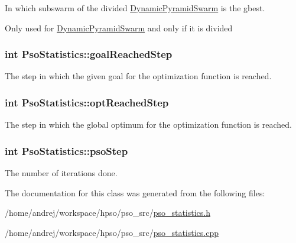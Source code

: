 In which subswarm of the divided \hyperlink{classDynamicPyramidSwarm}{DynamicPyramidSwarm} is the gbest. 

Only used for \hyperlink{classDynamicPyramidSwarm}{DynamicPyramidSwarm} and only if it is divided \hypertarget{classPsoStatistics_d4b9e6fa2b084958183b90d555103b15}{
\subsubsection{\setlength{\rightskip}{0pt plus 5cm}int {\bf PsoStatistics::goalReachedStep}}}
\label{classPsoStatistics_d4b9e6fa2b084958183b90d555103b15}


The step in which the given goal for the optimization function is reached. 

\hypertarget{classPsoStatistics_714187ea1f5645543c0250d19018d344}{
\subsubsection{\setlength{\rightskip}{0pt plus 5cm}int {\bf PsoStatistics::optReachedStep}}}
\label{classPsoStatistics_714187ea1f5645543c0250d19018d344}


The step in which the global optimum for the optimization function is reached. 

\hypertarget{classPsoStatistics_6f6a1e27328b88d53224fa45138bb1ef}{
\subsubsection{\setlength{\rightskip}{0pt plus 5cm}int {\bf PsoStatistics::psoStep}}}
\label{classPsoStatistics_6f6a1e27328b88d53224fa45138bb1ef}


The number of iterations done. 



The documentation for this class was generated from the following files:\begin{CompactItemize}
\item 
/home/andrej/workspace/hpso/pso\_\-src/\hyperlink{pso__statistics_8h}{pso\_\-statistics.h}\item 
/home/andrej/workspace/hpso/pso\_\-src/\hyperlink{pso__statistics_8cpp}{pso\_\-statistics.cpp}\end{CompactItemize}
